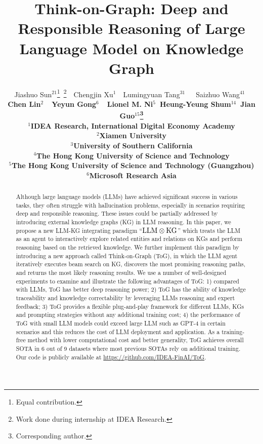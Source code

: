 \documentclass{article} %
\title{Think-on-Graph: Deep and Responsible Reasoning of Large Language Model on Knowledge Graph}
\author{Jiashuo Sun$^{21}$\thanks{Equal contribution.}~\thanks{Work done during internship at IDEA Research.}~~Chengjin Xu$^{1}$\footnotemark[1]~~Lumingyuan Tang$^{31}$\footnotemark[1]~\footnotemark[2]~~Saizhuo Wang$^{41}$\footnotemark[1]~\footnotemark[2]  \\ \bf Chen Lin$^{2}$~~Yeyun Gong$^{6}$~~Lionel M. Ni$^{5}$~Heung-Yeung Shum$^{14}$~Jian Guo$^{15}$\thanks{Corresponding author.}\\
$^1$IDEA Research, International Digital Economy Academy \\
$^2$Xiamen University \\ $^3$University of Southern California \\
$^4$The Hong Kong University of Science and Technology \\
$^5$The Hong Kong University of Science and Technology (Guangzhou) \\
$^6$Microsoft Research Asia \\}
\begin{document}
\maketitle

\begin{abstract}
\label{sec: abstract}
Although large language models (LLMs) have achieved significant success in various tasks, they often struggle with hallucination problems, especially in scenarios requiring deep and responsible reasoning. These issues could be partially addressed by introducing external knowledge graphs (KG) in LLM reasoning. In this paper, we propose a new LLM-KG integrating paradigm ``$\hbox{LLM}\otimes\hbox{KG}$'' which treats the LLM as an agent to interactively explore related entities and relations on KGs and perform reasoning based on the retrieved knowledge. We further implement this paradigm by introducing a new approach called Think-on-Graph (ToG), in which the LLM agent iteratively executes beam search on KG, discovers the most promising reasoning paths, and returns the most likely reasoning results. We use a number of well-designed experiments to examine and illustrate the following advantages of ToG: 1) compared with LLMs, ToG has better deep reasoning power; 2) ToG has the ability of knowledge traceability and knowledge correctability by leveraging LLMs reasoning and expert feedback; 3) ToG provides a flexible plug-and-play framework for different LLMs, KGs and prompting strategies without any additional training cost; 4) the performance of ToG with small LLM models could exceed large LLM such as GPT-4 in certain scenarios and this reduces the cost of LLM deployment and application. As a training-free method with lower computational cost and better generality, ToG achieves overall SOTA in 6 out of 9 datasets where most previous SOTAs rely on additional training. Our code is publicly available at \url{https://github.com/IDEA-FinAI/ToG}.

\end{abstract}
\end{document}
